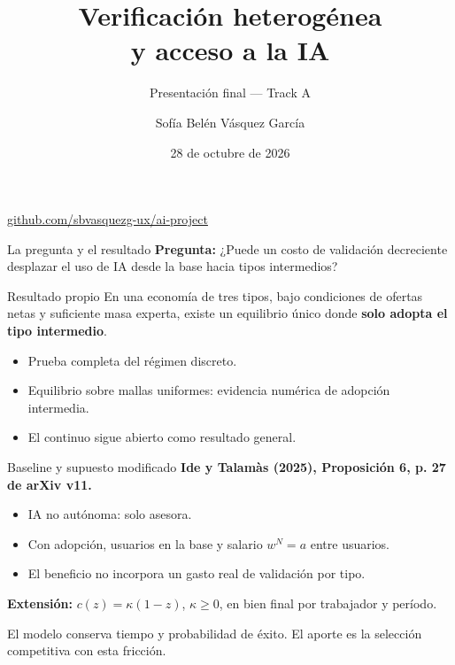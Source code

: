 \documentclass[aspectratio=169,11pt]{beamer}
\title[Verificación heterogénea y acceso a la IA]{Verificación heterogénea\\y acceso a la IA}
\subtitle{Presentación final --- Track A}
\author{Sofía Belén Vásquez García}\date{28 de octubre de 2026}
\begin{document}
\begin{frame}[plain]\titlepage
\begin{center}\small\href{https://github.com/sbvasquezg-ux/ai-project}{github.com/sbvasquezg-ux/ai-project}\end{center}
\end{frame}
\begin{frame}{La pregunta y el resultado}
\textbf{Pregunta:} ¿Puede un costo de validación decreciente desplazar el uso de IA desde la base hacia tipos intermedios?
\begin{block}{Resultado propio}
En una economía de tres tipos, bajo condiciones de ofertas netas y suficiente masa experta, existe un equilibrio único donde \textbf{solo adopta el tipo intermedio}.
\end{block}
\begin{itemize}
\item Prueba completa del régimen discreto.
\item Equilibrio sobre mallas uniformes: evidencia numérica de adopción intermedia.
\item El continuo sigue abierto como resultado general.
\end{itemize}
\end{frame}
\begin{frame}{Baseline y supuesto modificado}
\textbf{Ide y Talamàs (2025), Proposición 6, p. 27 de arXiv v11.}
\begin{itemize}
\item IA no autónoma: solo asesora.
\item Con adopción, usuarios en la base y salario $w^N=a$ entre usuarios.
\item El beneficio no incorpora un gasto real de validación por tipo.
\end{itemize}
\medskip
\textbf{Extensión:} $c(z)=\kappa(1-z)$, $\kappa\geq0$, en bien final por trabajador y período.
\begin{keybox}
El modelo conserva tiempo y probabilidad de éxito. El aporte es la selección competitiva con esta fricción.
\end{keybox}
\end{frame}
\end{document}

